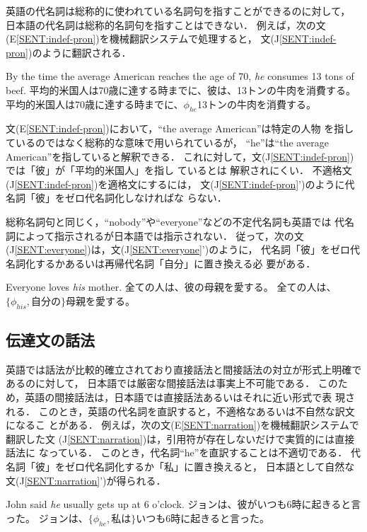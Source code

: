 英語の代名詞は総称的に使われている名詞句を指すことができるのに対して，
日本語の代名詞は総称的名詞句を指すことはできない\cite{Kanzaki94}．
例えば，次の文(E\ref{SENT:indef-pron})を機械翻訳システムで処理すると，
文(J\ref{SENT:indef-pron})のように翻訳される．
\begin{SENT2}
\sentE By the time the average American reaches the age of 70, {\it he} 
consumes 13 tons of beef.
\sentJ 平均的米国人は70歳に達する時までに、彼は、13トンの牛肉を消費する。
\NewsentJ 平均的米国人は70歳に達する時までに、$\phi_{he}$13トンの牛肉を消費する。
\label{SENT:indef-pron}
\end{SENT2}
文(E\ref{SENT:indef-pron})において，``the average American''は特定の人物
を指しているのではなく総称的な意味で用いられているが，
``he''は``the average American''を指していると解釈できる．
これに対して，文(J\ref{SENT:indef-pron})では「彼」が「平均的米国人」を指し
ているとは
解釈されにくい．
不適格文(J\ref{SENT:indef-pron})を適格文にするには，
文(J\ref{SENT:indef-pron}')のように代名詞「彼」をゼロ代名詞化しなければな
らない．

総称名詞句と同じく，``nobody''や``everyone''などの不定代名詞も英語では
代名詞によって指示されるが日本語では指示されない．
従って，次の文(J\ref{SENT:everyone})は，文(J\ref{SENT:everyone}')のように，
代名詞「彼」をゼロ代名詞化するかあるいは再帰代名詞「自分」に置き換える必
要がある．
\begin{SENT2}
\sentE Everyone loves {\it his} mother.
\sentJ 全ての人は、彼の母親を愛する。
\NewsentJ 全ての人は、$\{\phi_{his},自分の\}$母親を愛する。
\label{SENT:everyone}
\end{SENT2}

\subsection{伝達文の話法}
\label{sec:problem:narration}

英語では話法が比較的確立されており直接話法と間接話法の対立が形式上明確で
あるのに対して，
日本語では厳密な間接話法は事実上不可能である\cite{Anzai83}．
このため，英語の間接話法は，日本語では直接話法あるいはそれに近い形式で表
現される．
このとき，英語の代名詞を直訳すると，不適格なあるいは不自然な訳文になるこ
とがある．
例えば，次の文(E\ref{SENT:narration})を機械翻訳システムで翻訳した文
(J\ref{SENT:narration})は，引用符が存在しないだけで実質的には直接話法に
なっている．
このとき，代名詞``he''を直訳することは不適切である．
代名詞「彼」をゼロ代名詞化するか「私」に置き換えると，
日本語として自然な文(J\ref{SENT:narration}')が得られる．
\begin{SENT2}
\sentE John said {\it he} usually gets up at 6 o'clock.
\sentJ ジョンは、彼がいつも6時に起きると言った。
\NewsentJ ジョンは、$\{\phi_{he},私は\}$いつも6時に起きると言った。
\label{SENT:narration}
\end{SENT2}

